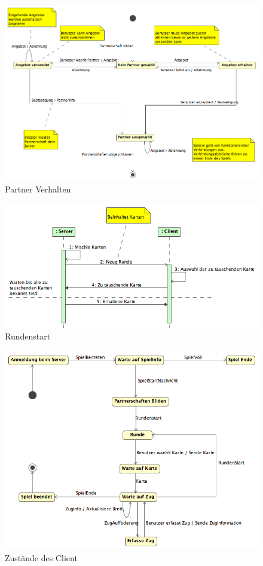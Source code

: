 \documentclass[a4paper,12pt,halfparskip,DIV12]{scrartcl}
\begin{document}
\begin{figure}
	\centering
	\includegraphics[width=\textwidth]{dienste_partner}
	\caption{Partner Verhalten}
	\label{fig:dienste_partner}
\end{figure}
\begin{figure}
	\centering
	\includegraphics[width=\textwidth]{dienste_rundenstart}
	\caption{Rundenstart}
	\label{fig:dienste_rundenstart}
\end{figure}
\begin{figure}
	\centering
	\includegraphics[width=0.8 \textwidth]{dienste_client}
	\caption{Zustände des Client}
	\label{fig:dienste_client}
\end{figure}
\end{document}
